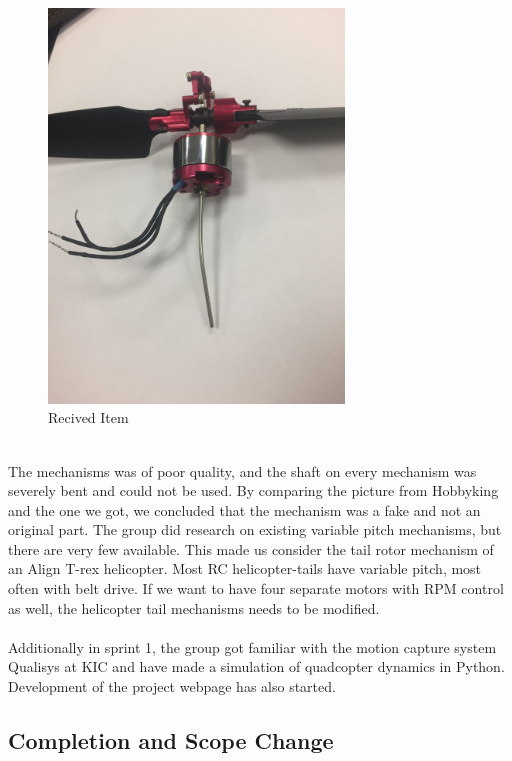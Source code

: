 \begin{figure}[h]
\begin{minipage}[b]{0.4\textwidth}
            \includegraphics[width = 0.7\textwidth]{VAPIQ-PICTURES/File_004}
            \caption{Recived Item}
            \label{fig:testpic3}
        \end{minipage}
\end{figure}
\\
The mechanisms was of poor quality, and the shaft on every mechanism was severely bent and could not be used. By comparing the picture from Hobbyking and the one we got, we concluded that the mechanism was a fake and not an original part. The group did research on existing variable pitch mechanisms, but there are very few available. This made us consider the tail rotor mechanism of an Align T-rex helicopter. Most RC helicopter-tails have variable pitch, most often with belt drive. If we want to have four separate motors with RPM control as well, the helicopter tail mechanisms needs to be modified.
\\\\
Additionally in sprint 1, the group got familiar with the motion capture system Qualisys at KIC and have made a simulation of quadcopter dynamics in Python. Development of the project webpage has also started.

\subsection{Completion and Scope Change}

